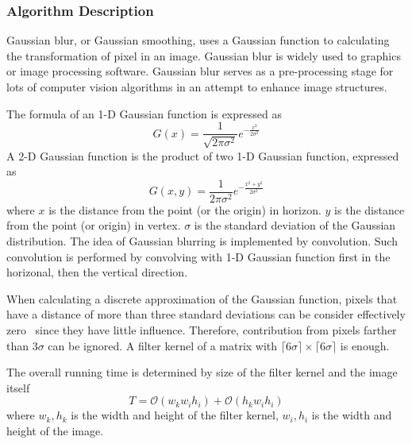 \documentclass[catalog.tex]{subfiles}
\begin{document}
\subsubsection{Algorithm Description}
\par Gaussian blur, or Gaussian smoothing, uses a Gaussian function to calculating the transformation of pixel in an image. Gaussian blur is widely used to graphics or image processing software. Gaussian blur serves as a pre-processing stage for lots of computer vision algorithms in an attempt to enhance image structures. 
\par The formula of an 1-D Gaussian function is expressed as
$$
	G(x)=\frac{1}{\sqrt{2 \pi \sigma^{2}}} e^{-\frac{x^{2}}{2 \sigma^{2}}}
$$
A 2-D Gaussian function is the product of two 1-D Gaussian function, expressed as~\cite{d_i_p}
$$
G(x, y)=\frac{1}{2 \pi \sigma^{2}} e^{-\frac{x^{2}+y^{2}}{2 \sigma^{2}}}
$$
where $x$ is the distance from the point (or the origin) in horizon. $y$ is the distance from the point (or origin) in vertex. $\sigma$ is the standard deviation of the Gaussian distribution.
The idea of Gaussian blurring is implemented by convolution. Such convolution is performed by convolving with 1-D Gaussian function first in the horizonal, then the vertical direction. 
\par When calculating a discrete approximation of the Gaussian function, pixels that have a distance of more than three standard deviations can be consider effectively zero~\cite{uk} since they have little influence. Therefore, contribution from pixels farther than $3\sigma$ can be ignored. A filter kernel of a matrix with $\lceil 6 \sigma\rceil \times\lceil 6 \sigma\rceil$ is enough. 
\par The overall running time is determined by size of the filter kernel and the image itself
$$
	T=\mathcal{O}(w_kw_ih_i)+\mathcal{O}(h_kw_ih_i)
$$
where $w_k,h_k$ is the width and height of the filter kernel, $w_i,h_i$ is the width and height of the image.
\newpage
\end{document}
